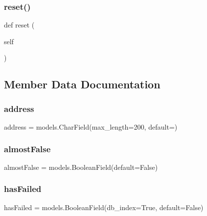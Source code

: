 \subsubsection{\texorpdfstring{reset()}{reset()}}
{\footnotesize\ttfamily def reset (\begin{DoxyParamCaption}\item[{}]{self }\end{DoxyParamCaption})}



\subsection{Member Data Documentation}
\mbox{\label{classdynamicfilterapp_1_1models_1_1_item_ade5a18d52133ef21f211020ceb464c07}} 
\subsubsection{\texorpdfstring{address}{address}}
{\footnotesize\ttfamily address = models.\+Char\+Field(max\+\_\+length=200, default=\textquotesingle{}\textquotesingle{})\hspace{0.3cm}{\ttfamily [static]}}

\mbox{\label{classdynamicfilterapp_1_1models_1_1_item_a088a878065d2b8209b1c4a23f482b70a}} 
\subsubsection{\texorpdfstring{almostFalse}{almostFalse}}
{\footnotesize\ttfamily almost\+False = models.\+Boolean\+Field(default=False)\hspace{0.3cm}{\ttfamily [static]}}

\mbox{\label{classdynamicfilterapp_1_1models_1_1_item_a5fa9cf9c305aeeef558cdf041085ccf1}} 
\subsubsection{\texorpdfstring{hasFailed}{hasFailed}}
{\footnotesize\ttfamily has\+Failed = models.\+Boolean\+Field(db\+\_\+index=True, default=False)\hspace{0.3cm}{\ttfamily [static]}}

